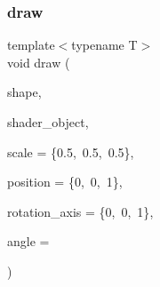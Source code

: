 \mbox{\label{classShape_a29e514c040e0781bfa2e08bcde4a7557}} 
\subsubsection{\texorpdfstring{draw}{draw}\hspace{0.1cm}{\footnotesize\ttfamily [2/2]}}
{\footnotesize\ttfamily template$<$typename T$>$ \\
void draw (\begin{DoxyParamCaption}\item[{\mbox{\hyperlink{classShape}{Shape}}$<$ T $>$ \&}]{shape,  }\item[{\mbox{\hyperlink{classShader}{Shader}}$<$ \mbox{\hyperlink{render_8hpp_a24e288e18eb7b6e01de7565001fedb60a9d34355b5a26c54b5dbab1e45245a6f4}{R\+E\+N\+D\+E\+R\+\_\+\+T\+Y\+P\+E\+::\+C\+U\+S\+T\+O\+M\+\_\+\+C\+O\+L\+OR}} $>$ \&}]{shader\+\_\+object,  }\item[{std\+::array$<$ float, 3 $>$}]{scale = {\ttfamily \{0.5,~0.5,~0.5\}},  }\item[{std\+::array$<$ float, 3 $>$}]{position = {\ttfamily \{0,~0,~1\}},  }\item[{std\+::array$<$ float, 3 $>$}]{rotation\+\_\+axis = {\ttfamily \{0,~0,~1\}},  }\item[{float}]{angle = {} }\end{DoxyParamCaption})\hspace{0.3cm}{\ttfamily [friend]}}

\mbox{\label{classShape_aaff31c90cf40c78284454009c9fe0966}} 

